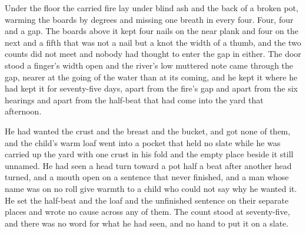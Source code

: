 Under the floor the carried fire lay under blind ash and the back of a broken pot, warming the boards by degrees and missing one breath in every four. Four, four and a gap. The boards above it kept four nails on the near plank and four on the next and a fifth that was not a nail but a knot the width of a thumb, and the two counts did not meet and nobody had thought to enter the gap in either. The door stood a finger's width open and the river's low muttered note came through the gap, nearer at the going of the water than at its coming, and he kept it where he had kept it for seventy-five days, apart from the fire's gap and apart from the six hearings and apart from the half-beat that had come into the yard that afternoon.

He had wanted the crust and the breast and the bucket, and got none of them, and the child's warm loaf went into a pocket that held no slate while he was carried up the yard with one crust in his fold and the empty place beside it still unnamed. He had seen a head turn toward a pot half a beat after another head turned, and a mouth open on a sentence that never finished, and a man whose name was on no roll give warmth to a child who could not say why he wanted it. He set the half-beat and the loaf and the unfinished sentence on their separate places and wrote no cause across any of them. The count stood at seventy-five, and there was no word for what he had seen, and no hand to put it on a slate.
